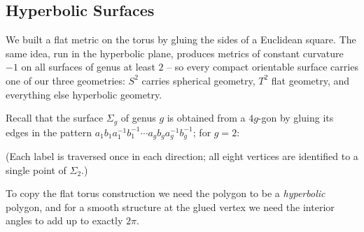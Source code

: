 \subsection{Hyperbolic Surfaces}

We built a flat metric on the torus by gluing the sides of a Euclidean square. The same idea, run in the hyperbolic plane, produces metrics of constant curvature $-1$ on all surfaces of genus at least $2$ -- so every compact orientable surface carries one of our three geometries: $S^2$ carries spherical geometry, $T^2$ flat geometry, and everything else hyperbolic geometry.

Recall that the surface $\Sigma_g$ of genus $g$ is obtained from a $4g$-gon by gluing its edges in the pattern $a_1 b_1 a_1^{-1} b_1^{-1} \cdots a_g b_g a_g^{-1} b_g^{-1}$; for $g = 2$:
\begin{center}
\end{center}
(Each label is traversed once in each direction; all eight vertices are identified to a single point of $\Sigma_2$.)

To copy the flat torus construction we need the polygon to be a \emph{hyperbolic} polygon, and for a smooth structure at the glued vertex we need the interior angles to add up to exactly $2\pi$.

